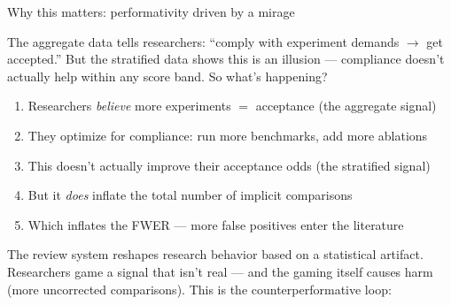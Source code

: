\documentclass[aspectratio=169,11pt]{beamer}
\begin{document}
\begin{frame}{Why this matters: performativity driven by a mirage}

{\small The aggregate data tells researchers: ``comply with experiment demands $\to$ get accepted.'' But the stratified data shows this is an illusion --- compliance doesn't actually help within any score band. So what's happening?}

\vspace{0.3em}

\begin{enumerate}\setlength\itemsep{3pt}
  \item {\small Researchers \emph{believe} more experiments $=$ acceptance (the aggregate signal)}
  \item {\small They optimize for compliance: run more benchmarks, add more ablations}
  \item {\small This doesn't actually improve their acceptance odds (the stratified signal)}
  \item {\small But it \emph{does} inflate the total number of implicit comparisons}
  \item {\small Which inflates the FWER --- more false positives enter the literature}
\end{enumerate}

\vspace{0.3em}

{\small The review system reshapes research behavior based on a statistical artifact. Researchers game a signal that isn't real --- and the gaming itself causes harm (more uncorrected comparisons). This is the counterperformative loop:}
\end{frame}
\end{document}
